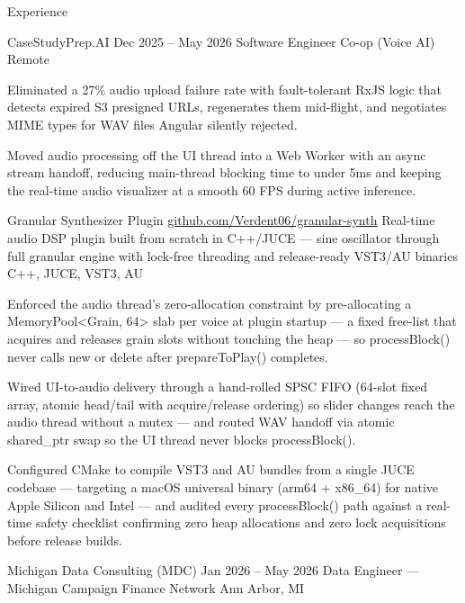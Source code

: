 \documentclass[
	11pt
]{../../../template}
\begin{document}
	\begin{rSection}{E}{xperience}
		\begin{rSectionEntry}
			{CaseStudyPrep.AI}
			{Dec 2025 -- May 2026}
			{Software Engineer Co-op (Voice AI)}
			{}
			{Remote}

			\item Eliminated a 27\% audio upload failure rate with fault-tolerant RxJS logic that detects expired S3 presigned URLs, regenerates them mid-flight, and negotiates MIME types for WAV files Angular silently rejected.
			\item Moved audio processing off the UI thread into a Web Worker with an async stream handoff, reducing main-thread blocking time to under 5ms and keeping the real-time audio visualizer at a smooth 60 FPS during active inference.
		\end{rSectionEntry}

		\begin{rSectionEntry}
			{Granular Synthesizer Plugin}
			{\href{https://github.com/Verdent06/granular-synth}{github.com/Verdent06/granular-synth}}
			{Real-time audio DSP plugin built from scratch in C++/JUCE --- sine oscillator through full granular engine with lock-free threading and release-ready VST3/AU binaries}
			{C++, JUCE, VST3, AU}
			{}

			\item Enforced the audio thread's zero-allocation constraint by pre-allocating a MemoryPool<Grain, 64> slab per voice at plugin startup --- a fixed free-list that acquires and releases grain slots without touching the heap --- so processBlock() never calls new or delete after prepareToPlay() completes.
			\item Wired UI-to-audio delivery through a hand-rolled SPSC FIFO (64-slot fixed array, atomic head/tail with acquire/release ordering) so slider changes reach the audio thread without a mutex --- and routed WAV handoff via atomic shared\_ptr swap so the UI thread never blocks processBlock().
			\item Configured CMake to compile VST3 and AU bundles from a single JUCE codebase --- targeting a macOS universal binary (arm64 + x86\_64) for native Apple Silicon and Intel --- and audited every processBlock() path against a real-time safety checklist confirming zero heap allocations and zero lock acquisitions before release builds.
		\end{rSectionEntry}

		\begin{rSectionEntry}
			{Michigan Data Consulting (MDC)}
			{Jan 2026 -- May 2026}
			{Data Engineer --- Michigan Campaign Finance Network}
			{}
			{Ann Arbor, MI}


\end{rSectionEntry}
\end{rSection}
\end{document}

